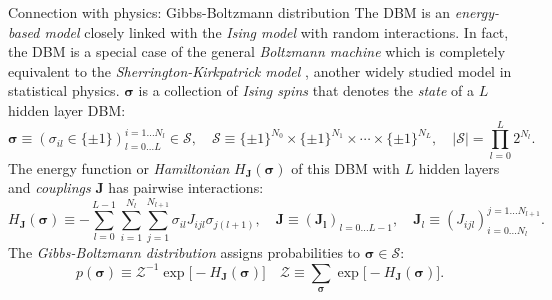 \documentclass[8pt]{beamer}
\begin{document}
\begin{frame}[label={sec:org92ea9e6}]{Connection with physics: Gibbs-Boltzmann distribution}
The DBM is an \emph{energy-based model} closely linked with the \emph{Ising model} with random interactions. In fact, the DBM is a special case of the general \emph{Boltzmann machine} which is completely equivalent to the \emph{Sherrington-Kirkpatrick model} \cite{sherrington1975solvable}, another widely studied model in statistical physics.
\(\boldsymbol{\sigma}\) is a collection of \emph{Ising spins} that denotes the \emph{state} of a \(L\) hidden layer DBM:
  \[
  \boldsymbol{\sigma} \equiv (\sigma_{il} \in \{\pm 1\})_{l=0 \ldots L}^{i = 1 \ldots N_{l}} \in \mathcal{S}, \quad \mathcal{S} \equiv \{\pm 1\}^{N_{0}} \times \{\pm 1\}^{N_{1}} \times \cdots \times \{\pm 1\}^{N_{L}}, \quad |\mathcal{S}| = \prod_{l=0}^{L} 2^{N_{l}}.
  \]
The energy function or \emph{Hamiltonian} \(H_{\boldsymbol{J}} (\boldsymbol{\sigma})\) of this DBM with \(L\) hidden layers and \emph{couplings} \(\boldsymbol{J}\) has pairwise interactions:
  \[
  H_{\boldsymbol{J}} (\boldsymbol{\sigma}) \equiv - \sum_{l=0}^{L-1} \sum_{i=1}^{N_l} \sum_{j=1}^{N_{l+1}} \sigma_{il} J_{ijl} \sigma_{j(l+1)}, \quad \boldsymbol{J} \equiv (\boldsymbol{J_{l}})_{l=0 \ldots L-1}, \quad \boldsymbol{J}_{l} \equiv (J_{ijl})_{i=0 \ldots N_{l}}^{j=1 \ldots N_{l+1}}.
  \]
The \emph{Gibbs-Boltzmann distribution} assigns probabilities to \(\boldsymbol{\sigma} \in \mathcal{S}\):
  \[
  p (\boldsymbol{\sigma}) \equiv \mathcal{Z}^{-1} \exp \big[- H_{\boldsymbol{J}} (\boldsymbol{\sigma}) \big] \quad \mathcal{Z} \equiv \sum_{\boldsymbol{\sigma}} \exp \big[- H_{\boldsymbol{J}} (\boldsymbol{\sigma}) \big].
  \]
\end{frame}
\end{document}

